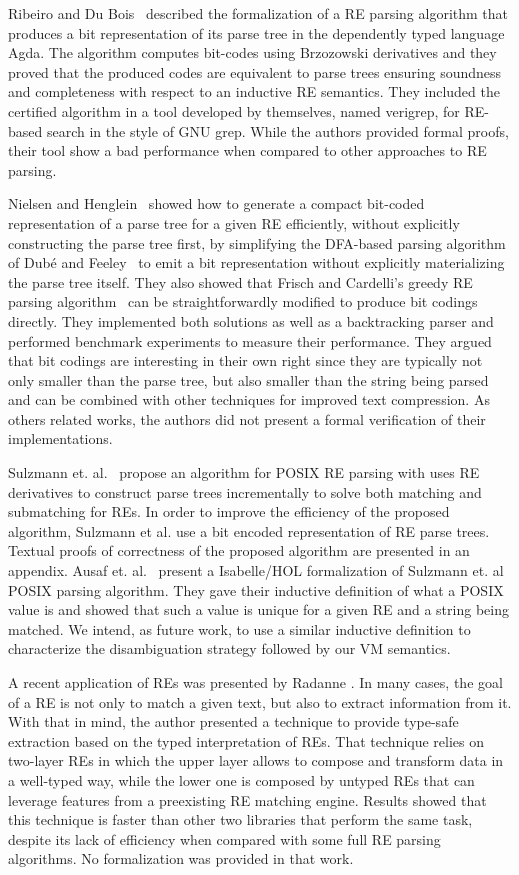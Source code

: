 \documentclass[review]{elsarticle}
\theoremstyle{definition}
\begin{document}
Ribeiro and Du Bois~\cite{Ribeiro2017} described the formalization of a RE parsing algorithm that produces a bit representation
of its parse tree in the dependently typed language Agda. The algorithm computes bit-codes using Brzozowski derivatives and
they proved that the produced codes are equivalent to parse trees ensuring soundness and completeness with respect to an
inductive RE semantics. They included the certified algorithm in a tool developed by themselves, named verigrep, for RE-based
search in the style of GNU grep. While the authors provided formal proofs, their tool show a bad performance when compared to
other approaches to RE parsing.

Nielsen and Henglein~\cite{Lasse2011} showed how to generate a compact bit-coded representation of a parse tree for a
given RE efficiently, without explicitly constructing the parse tree first, by simplifying the DFA-based parsing algorithm of
Dubé and Feeley~\cite{Dube2000} to emit a bit representation without explicitly materializing the parse tree itself.
They also showed that Frisch and Cardelli’s greedy RE parsing algorithm~\cite{Frisch2004} can be straightforwardly modified to
produce bit codings directly. They implemented both solutions as well as a backtracking parser and performed benchmark experiments
to measure their performance. They argued that bit codings are interesting in their own right since they are typically not
only smaller than the parse tree, but also smaller than the string being parsed and can be combined with other techniques for
improved text compression. As others related works, the authors did not present a formal verification of their implementations.

Sulzmann et. al.~\cite{Sulzmann14} propose an algorithm for POSIX RE parsing
with uses RE derivatives to construct parse trees incrementally to solve both 
matching and submatching for REs. In order to improve the
efficiency of the proposed algorithm, Sulzmann et al. use a bit encoded representation of RE parse trees. Textual proofs of
correctness of the proposed algorithm are presented in an appendix.
Ausaf et. al.~\cite{Ausaf16} present a Isabelle/HOL formalization of Sulzmann et. al POSIX
parsing algorithm. They gave their inductive definition of what a
POSIX value is and showed that such a value is unique for a given RE and a
string being matched. We intend, as future work, to use a similar inductive
definition to characterize the disambiguation strategy followed by our VM semantics.

A recent application of REs was presented by Radanne \cite{Radanne2019}. In many
cases, the goal of a RE is not only to match a given text, but also to extract 
information from it. With that in mind, the author presented a technique to 
provide type-safe extraction based on the typed interpretation of REs. That 
technique relies on two-layer REs in which the upper layer allows to compose and 
transform data in a well-typed way, while the lower one is composed by untyped
REs that can leverage features from a preexisting RE matching engine. Results 
showed that this technique is faster than other two libraries that perform the 
same task, despite its lack of efficiency when compared with some full RE 
parsing algorithms. No formalization was provided in that work.
\end{document}
